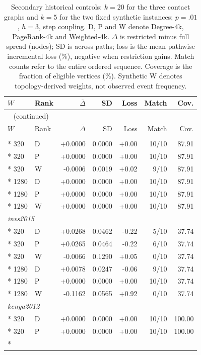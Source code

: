 \begin{longtable}{llrrrrr}
\caption{Secondary historical controls: $k=20$ for the three contact graphs and $k=5$ for the two fixed synthetic instances; $p=.01$, $h=3$, step coupling. D, P and W denote Degree-4k, PageRank-4k and Weighted-4k. $\Delta$ is restricted minus full spread (nodes); SD is across paths; loss is the mean pathwise incremental loss (\%), negative when restriction gains. Match counts refer to the entire ordered sequence. Coverage is the fraction of eligible vertices (\%). Synthetic W denotes topology-derived weights, not observed event frequency.}\label{tab:hist-secondary}\\
\toprule
$W$ & Rank & $\overline\Delta$ & SD & Loss & Match & Cov. \\
\midrule
\endfirsthead
\multicolumn{7}{l}{\tablename~\thetable{} (continued)}\\
\toprule
$W$ & Rank & $\overline\Delta$ & SD & Loss & Match & Cov. \\
\midrule
\endhead
\bottomrule
\endfoot
\multicolumn{7}{l}{\textit{invs2013}}\\*
320 & D & +0.0000 & 0.0000 & +0.00 & 10/10 & 87.91\\*
320 & P & +0.0000 & 0.0000 & +0.00 & 10/10 & 87.91\\*
320 & W & -0.0006 & 0.0019 & +0.02 & 9/10 & 87.91\\*
1280 & D & +0.0000 & 0.0000 & +0.00 & 10/10 & 87.91\\*
1280 & P & +0.0000 & 0.0000 & +0.00 & 10/10 & 87.91\\*
1280 & W & +0.0000 & 0.0000 & +0.00 & 10/10 & 87.91\\
\multicolumn{7}{l}{\textit{invs2015}}\\*
320 & D & +0.0268 & 0.0462 & -0.22 & 5/10 & 37.74\\*
320 & P & +0.0265 & 0.0464 & -0.22 & 6/10 & 37.74\\*
320 & W & -0.0066 & 0.1290 & +0.05 & 0/10 & 37.74\\*
1280 & D & +0.0078 & 0.0247 & -0.06 & 9/10 & 37.74\\*
1280 & P & +0.0000 & 0.0000 & +0.00 & 10/10 & 37.74\\*
1280 & W & -0.1162 & 0.0565 & +0.92 & 0/10 & 37.74\\
\multicolumn{7}{l}{\textit{kenya2012}}\\*
320 & D & +0.0000 & 0.0000 & +0.00 & 10/10 & 100.00\\*
320 & P & +0.0000 & 0.0000 & +0.00 & 10/10 & 100.00\\*

\end{longtable}
